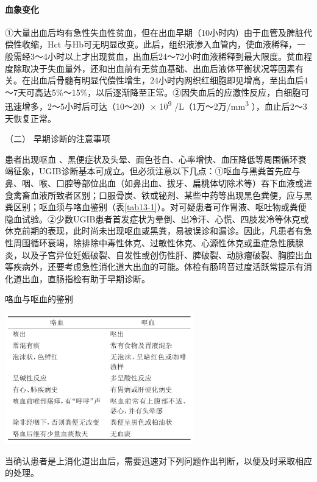 \paragraph{血象变化}

①大量出血后均有急性失血性贫血，但在出血早期（10小时内）由于血管及脾脏代偿性收缩，Hct
与Hb可无明显改变。此后，组织液渗入血管内，使血液稀释，一般需经3～4小时以上才出现贫血，出血后24～72小时血液稀释到最大限度。贫血程度除取决于失血量外，还和出血前有无贫血基础、出血后液体平衡状况等因素有关。在出血后骨髓有明显代偿性增生，24小时内网织红细胞即见增高，至出血后4～7天可高达5\%～15\%，以后逐渐降至正常。②因失血后的应激性反应，白细胞可迅速增多，2～5小时后可达（10～20）×
10\textsuperscript{9} /L（1万～2万/mm\textsuperscript{3}
），血止后2～3天恢复正常。

\hypertarget{text00032.htmlux5cux23CHP1-13-1-4-1-2}{}
（二） 早期诊断的注意事项

患者出现呕血
、黑便症状及头晕、面色苍白、心率增快、血压降低等周围循环衰竭征象，UGIB诊断基本可成立。但必须注意以下几点：①呕血与黑粪首先应与鼻、咽、喉、口腔等部位出血（如鼻出血、拔牙、扁桃体切除术等）吞下血液或进食禽畜血液所致者区别；口服骨炭、铁或铋剂、某些中药等出现黑色粪便，应与黑粪区别；呕血须与咯血鉴别（表\ref{tab13-1}）。对可疑患者可作胃液、呕吐物或粪便隐血试验。②少数UGIB患者首发症状为晕倒、出冷汗、心慌、四肢发冷等休克或休克前期的表现，此时尚未出现呕血或黑粪，易被误诊和漏诊。因此，凡患者有急性周围循环衰竭，除排除中毒性休克、过敏性休克、心源性休克或重症急性胰腺炎，以及子宫异位妊娠破裂、自发性或创伤性肝、脾破裂、动脉瘤破裂、胸腔出血等疾病外，还要考虑急性消化道大出血的可能。体检有肠鸣音过度活跃常提示有消化道出血，直肠指检有助于早期诊断。

\begin{table}[htbp]
\centering
\caption{咯血与呕血的鉴别}
\label{tab13-1}
\includegraphics[width=3.22917in,height=2.21875in]{./images/Image00053.jpg}
\end{table}

当确认患者是上消化道出血后，需要迅速对下列问题作出判断，以便及时采取相应的处理。

